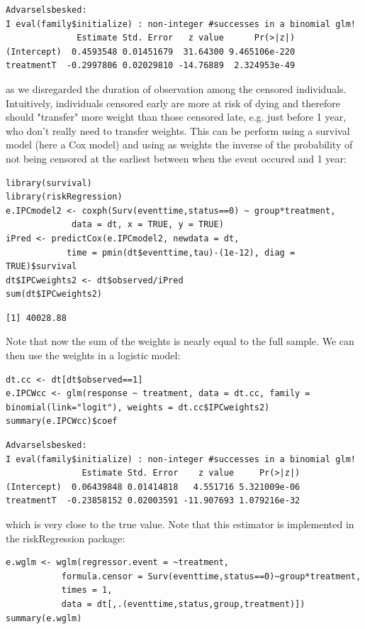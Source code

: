 \documentclass[12pt]{article}
\begin{document}
\begin{verbatim}
Advarselsbesked:
I eval(family$initialize) : non-integer #successes in a binomial glm!
              Estimate Std. Error   z value      Pr(>|z|)
(Intercept)  0.4593548 0.01451679  31.64300 9.465106e-220
treatmentT  -0.2997806 0.02029810 -14.76889  2.324953e-49
\end{verbatim}


as we disregarded the duration of observation among the censored
individuals. Intuitively, individuals censored early are more at risk
of dying and therefore should "transfer" more weight than those
censored late, e.g. just before 1 year, who don't really need to
transfer weights. This can be perform using a survival model (here a
Cox model) and using as weights the inverse of the probability of not
being censored at the earliest between when the event occured and 1
year:
\lstset{language=r,label= ,caption= ,captionpos=b,numbers=none}
\begin{lstlisting}
library(survival)
library(riskRegression)
e.IPCmodel2 <- coxph(Surv(eventtime,status==0) ~ group*treatment,
		     data = dt, x = TRUE, y = TRUE)
iPred <- predictCox(e.IPCmodel2, newdata = dt,
		    time = pmin(dt$eventtime,tau)-(1e-12), diag = TRUE)$survival
dt$IPCweights2 <- dt$observed/iPred
sum(dt$IPCweights2)
\end{lstlisting}

\begin{verbatim}
[1] 40028.88
\end{verbatim}


Note that now the sum of the weights is nearly equal to the full
sample. We can then use the weights in a logistic model:
\lstset{language=r,label= ,caption= ,captionpos=b,numbers=none}
\begin{lstlisting}
dt.cc <- dt[dt$observed==1]
e.IPCWcc <- glm(response ~ treatment, data = dt.cc, family = binomial(link="logit"), weights = dt.cc$IPCweights2)
summary(e.IPCWcc)$coef
\end{lstlisting}

\begin{verbatim}
Advarselsbesked:
I eval(family$initialize) : non-integer #successes in a binomial glm!
               Estimate Std. Error    z value     Pr(>|z|)
(Intercept)  0.06439848 0.01414818   4.551716 5.321009e-06
treatmentT  -0.23858152 0.02003591 -11.907693 1.079216e-32
\end{verbatim}


which is very close to the true value. Note that this estimator is
implemented in the riskRegression package:
\lstset{language=r,label= ,caption= ,captionpos=b,numbers=none}
\begin{lstlisting}
e.wglm <- wglm(regressor.event = ~treatment,
	       formula.censor = Surv(eventtime,status==0)~group*treatment,
	       times = 1,
	       data = dt[,.(eventtime,status,group,treatment)])
summary(e.wglm)
\end{lstlisting}
\end{document}
